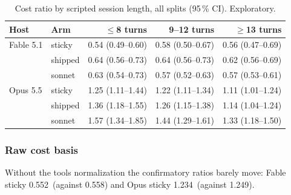\documentclass[11pt,letterpaper]{article}
\newcommand{\CfFableStickyPair}{0.558}
\newcommand{\CfOpusStickyPair}{1.249}
\newcommand{\RawFableSticky}{0.552}
\newcommand{\RawOpusSticky}{1.234}
\begin{document}
\begin{table}[tbp]
\centering\small
\caption{Cost ratio by scripted session length, all splits (95\,\% CI). Exploratory.}
\label{vt:tab:sliceturns}
\begin{tabular*}{\textwidth}{@{\extracolsep{\fill}}l l r r r @{}}
\toprule
Host & Arm & $\le$8 turns & 9--12 turns & $\ge$13 turns \\
\midrule
Fable 5.1 & sticky & 0.54 (0.49--0.60) & 0.58 (0.50--0.67) & 0.56 (0.47--0.69) \\
 & shipped & 0.64 (0.56--0.73) & 0.64 (0.56--0.73) & 0.62 (0.56--0.69) \\
 & sonnet & 0.63 (0.54--0.73) & 0.57 (0.52--0.63) & 0.57 (0.53--0.61) \\
\addlinespace[3pt]
Opus 5.5 & sticky & 1.25 (1.11--1.44) & 1.22 (1.11--1.34) & 1.11 (1.01--1.24) \\
 & shipped & 1.36 (1.18--1.55) & 1.26 (1.15--1.38) & 1.14 (1.04--1.24) \\
 & sonnet & 1.57 (1.34--1.85) & 1.44 (1.29--1.61) & 1.33 (1.18--1.50) \\
\bottomrule
\end{tabular*}
 \end{table}

\subsubsection*{Raw cost basis}\label{vt:sec:rawbasis}
Without the tools normalization the confirmatory ratios barely move: Fable sticky \RawFableSticky\ (against
\CfFableStickyPair) and Opus sticky \RawOpusSticky\ (against \CfOpusStickyPair).
\end{document}
